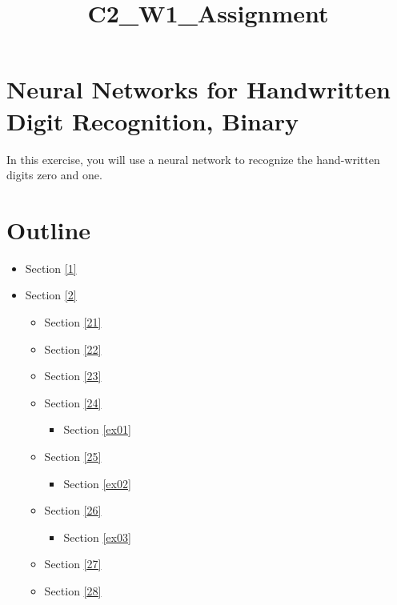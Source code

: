\documentclass[11pt]{article}
\title{C2\_W1\_Assignment}
\providecommand{\tightlist}{%
      \setlength{\itemsep}{0pt}\setlength{\parskip}{0pt}}
\begin{document}
    
    \maketitle
    
    

    
    \hypertarget{neural-networks-for-handwritten-digit-recognition-binary}{%
\section{Neural Networks for Handwritten Digit Recognition,
Binary}\label{neural-networks-for-handwritten-digit-recognition-binary}}

In this exercise, you will use a neural network to recognize the
hand-written digits zero and one.

\hypertarget{outline}{%
\section{Outline}\label{outline}}

\begin{itemize}
\tightlist
\item
  Section \ref{1}
\item
  Section \ref{2}

  \begin{itemize}
  \tightlist
  \item
    Section \ref{21}
  \item
    Section \ref{22}
  \item
    Section \ref{23}
  \item
    Section \ref{24}

    \begin{itemize}
    \tightlist
    \item
      Section \ref{ex01}
    \end{itemize}
  \item
    Section \ref{25}

    \begin{itemize}
    \tightlist
    \item
      Section \ref{ex02}
    \end{itemize}
  \item
    Section \ref{26}

    \begin{itemize}
    \tightlist
    \item
      Section \ref{ex03}
    \end{itemize}
  \item
    Section \ref{27}
  \item
    Section \ref{28}
  \end{itemize}
\end{itemize}
\end{document}
